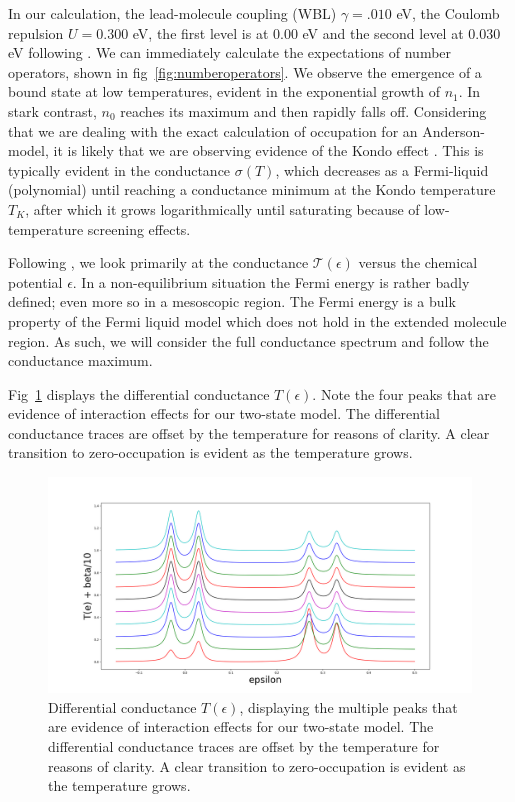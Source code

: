 \documentclass{article}
\begin{document}
\begin{multicols}{2}
        In our calculation, the lead-molecule coupling (WBL) $\gamma=.010$ eV, the Coulomb repulsion $U=0.300$ eV, the first level is at $0.00$ eV and the second level at $0.030$ eV following \cite{meir}. We can immediately calculate the expectations of number operators, shown in fig~\ref{fig:numberoperators}. We observe the emergence of a bound state at low temperatures, evident in the exponential growth of $n_1$. In stark contrast, $n_0$ reaches its maximum and then rapidly falls off. Considering that we are dealing with the exact calculation of occupation for an Anderson-model, it is likely that we are observing evidence of the Kondo effect \cite{josherrereview}. This is typically evident in the conductance $\sigma(T)$, which decreases as a Fermi-liquid (polynomial) until reaching a conductance minimum at the Kondo temperature $T_K$, after which it grows logarithmically until saturating because of low-temperature screening effects.
        
        Following \citet{meir}, we look primarily at the conductance $\mathscr{T}(\epsilon)$ versus the chemical potential $\epsilon$. In a non-equilibrium situation the Fermi energy is rather badly defined; even more so in a mesoscopic region. The Fermi energy is a bulk property of the Fermi liquid model which does not hold in the extended molecule region. As such, we will consider the full conductance spectrum and follow the conductance maximum.
        
        Fig~\ref{fig:transplot} displays the differential conductance $T(\epsilon)$. Note the four peaks that are evidence of interaction effects for our two-state model. The differential conductance traces are offset by the temperature for reasons of clarity. A clear transition to zero-occupation is evident as the temperature grows.
        
        \begin{figure}[b]
            \centering
            \includegraphics[width=\textwidth]{fig/figure_3.png}
            \caption{\label{fig:transplot} Differential conductance $T(\epsilon)$, displaying the multiple peaks that are evidence of interaction effects for our two-state model. The differential conductance traces are offset by the temperature for reasons of clarity. A clear transition to zero-occupation is evident as the temperature grows.}
        \end{figure}
        

\end{multicols}
\end{document}
